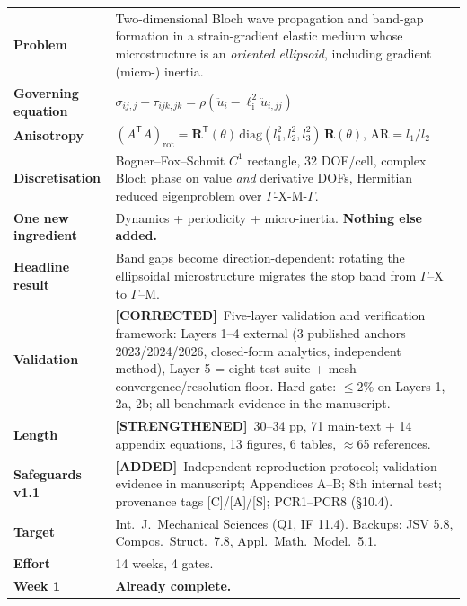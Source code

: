 \documentclass[11pt,a4paper]{article}
\newcommand{\ADDED}{{\color{addcol}\textbf{[ADDED]}}}
\newcommand{\STR}{{\color{strcol}\textbf{[STRENGTHENED]}}}
\newcommand{\COR}{{\color{corcol}\textbf{[CORRECTED]}}}
\begin{document}
\begin{xltabular}{\textwidth}{@{}L{3.3cm} Y@{}}
\textbf{Problem} & Two-dimensional Bloch wave propagation and band-gap formation in a strain-gradient elastic medium whose microstructure is an \emph{oriented ellipsoid}, including gradient (micro-) inertia. \\
\textbf{Governing equation} & $\sigma_{ij,j}-\tau_{ijk,jk}=\rho\left(\ddot u_i-\ell_{\mathrm i}^2\ddot u_{i,jj}\right)$ \\
\textbf{Anisotropy} & $(A^{\mathsf T}\!A)_{\mathrm{rot}}=\bm R^{\mathsf T}(\theta)\,\mathrm{diag}(l_1^2,l_2^2,l_3^2)\,\bm R(\theta)$, \quad $\mathrm{AR}=l_1/l_2$ \\
\textbf{Discretisation} & Bogner--Fox--Schmit $C^1$ rectangle, 32 DOF/cell, complex Bloch phase on value \emph{and} derivative DOFs, Hermitian reduced eigenproblem over $\Gamma$-X-M-$\Gamma$. \\
\textbf{One new ingredient} & Dynamics + periodicity + micro-inertia. \textbf{Nothing else added.} \\
\textbf{Headline result} & Band gaps become direction-dependent: rotating the ellipsoidal microstructure migrates the stop band from $\Gamma$--X to $\Gamma$--M. \\
\textbf{Validation} & \COR\ Five-layer validation and verification framework: Layers 1--4 external (3 published anchors 2023/2024/2026, closed-form analytics, independent method), Layer 5 = eight-test suite + mesh convergence/resolution floor. Hard gate: $\le2\%$ on Layers 1, 2a, 2b; all benchmark evidence in the manuscript. \\
\textbf{Length} & \STR\ 30--34 pp, 71 main-text + 14 appendix equations, 13 figures, 6 tables, $\approx$65 references. \\
\textbf{Safeguards v1.1} & \ADDED\ Independent reproduction protocol; validation evidence in manuscript; Appendices A--B; 8th internal test; provenance tags [C]/[A]/[S]; PCR1--PCR8 (\S10.4). \\
\textbf{Target} & Int.\ J.\ Mechanical Sciences (Q1, IF 11.4). Backups: JSV 5.8, Compos.\ Struct.\ 7.8, Appl.\ Math.\ Model.\ 5.1. \\
\textbf{Effort} & 14 weeks, 4 gates. \\
\textbf{Week 1} & \textcolor{ok}{\textbf{Already complete.}} \\
\end{xltabular}
\end{document}
